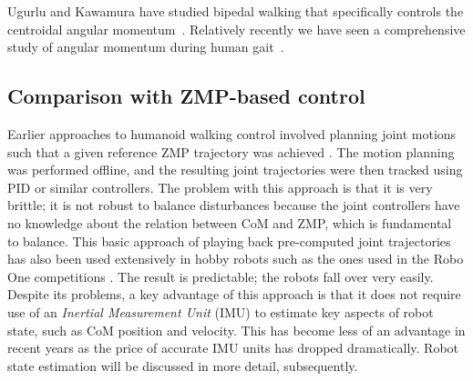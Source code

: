 \documentclass{llncs}
\begin{document}

Ugurlu and Kawamura have studied bipedal walking that
specifically controls the centroidal angular momentum~\cite{UK10}.
Relatively recently we have seen a comprehensive
study of angular momentum during human gait~\cite{HP08}.


\subsection{Comparison with ZMP-based control}

Earlier approaches to humanoid walking control involved planning joint motions such that a 
given reference ZMP trajectory was achieved \cite{nishiwaki2001online}.
The motion planning was performed offline, and the resulting joint trajectories were then tracked 
using PID or similar controllers.
The problem with this approach is that it is very brittle;  it is not robust to balance disturbances
because the joint controllers have no knowledge about the relation between CoM and ZMP, which is 
fundamental to balance.
This basic approach of playing back pre-computed joint trajectories has also been used extensively
in hobby robots such as the ones used in the Robo One competitions \cite{roboone}.  
The result is predictable;  the robots fall over very easily.
Despite its problems, a key advantage of this approach is that it does not require use of an
\textit{Inertial Measurement Unit} (IMU) to estimate key aspects of robot state, such as CoM position
and velocity.  
This has become less of an advantage in recent years as the price of accurate 
IMU units has dropped dramatically.
Robot state estimation will be discussed in more detail, subsequently.
\end{document}
